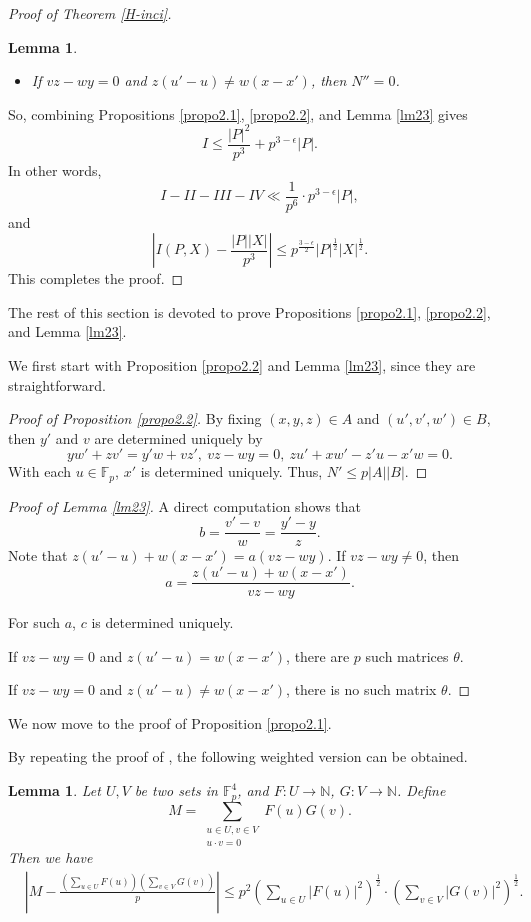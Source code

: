 \documentclass[11pt]{article}
\newtheorem{lemma}[theorem]{Lemma}
\begin{document}
\begin{proof}[Proof of Theorem \ref{H-inci}]
\begin{lemma}
\begin{itemize}
\item If $vz-wy=0$ and $z(u'-u)\ne w(x-x')$, then $N''=0$.
\end{itemize}
\end{lemma}


So, combining Propositions \ref{propo2.1}, \ref{propo2.2}, and Lemma \ref{lm23} gives
\[I\le \frac{|P|^2}{p^3}+p^{3-\epsilon}|P|.\]
In other words,
\[I-II-III-IV\ll \frac{1}{p^6}\cdot p^{3-\epsilon}|P|,\]
and 
 \[\left\vert I(P, X)- \frac{|P||X|}{p^3} \right\vert\le p^{\frac{3-\epsilon}{2}}|P|^{\frac{1}{2}}|X|^{\frac{1}{2}}.\]
 This completes the proof.
\end{proof}

The rest of this section is devoted to prove Propositions \ref{propo2.1}, \ref{propo2.2}, and Lemma \ref{lm23}.

We first start with Proposition \ref{propo2.2} and Lemma \ref{lm23}, since they are straightforward. 

\begin{proof}[Proof of Proposition \ref{propo2.2}]
    By fixing $(x, y, z)\in A$ and $(u', v', w')\in B$, then $y'$ and $v$ are determined uniquely by 
    \[yw'+zv'=y'w+vz', ~vz-wy=0, ~zu'+xw'-z'u-x'w=0.\]
With each $u\in \mathbb{F}_p$, $x'$ is determined uniquely. Thus, $N'\le p|A||B|$.
\end{proof}
\begin{proof}[Proof of Lemma \ref{lm23}]
A direct computation shows that 
\[b=\frac{v'-v}{w}=\frac{y'-y}{z}.\]
Note that $z(u'-u)+w(x-x')=a(vz-wy)$. If $vz-wy\ne 0$, then 
\[a=\frac{z(u'-u)+w(x-x')}{vz-wy}.\]

For such $a$, $c$ is determined uniquely. 

If $vz-wy=0$ and $z(u'-u)=w(x-x')$, there are $p$ such matrices $\theta$. 

If $vz-wy=0$ and $z(u'-u)\ne w(x-x')$, there is no such matrix $\theta$. 
\end{proof}

We now move to the proof of Proposition \ref{propo2.1}.

By repeating the proof of \cite[Theorem 2.1]{Hetal}, the following weighted version can be obtained. 
\begin{lemma}\label{lm3.3}
    Let $U, V$ be two sets in $\mathbb{F}_p^4$, and $F\colon U\to \mathbb{N}$, $G\colon V\to \mathbb{N}$. 
   Define 
   \[M=\sum_{\substack{u\in U, v\in V\\ u\cdot v=0}}F(u)G(v).\]Then we have 
    \begin{align*}
    &\left\vert M-\frac{(\sum_{u\in U}F(u))(\sum_{v\in V}G(v))}{p}\right\vert\le  p^2\left(\sum_{u\in U}|F(u)|^2\right)^{\frac{1}{2}}\cdot \left(\sum_{v\in V}|G(v)|^2\right)^{\frac{1}{2}}.     
    \end{align*}
\end{lemma}
\end{document}
